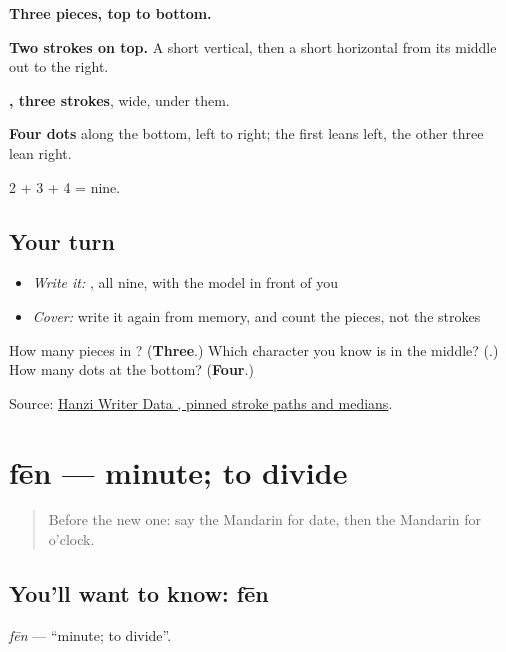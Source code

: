 \begin{quote}
\end{quote}

\textbf{Three pieces, top to bottom.}

\textbf{Two strokes on top.} A short vertical, then a short horizontal from its middle out to the right.

\textbf{, three strokes}, wide, under them.

\textbf{Four dots} along the bottom, left to right; the first leans left, the other three lean right.

2 + 3 + 4 = nine.

\subsection*{Your turn}
\begin{itemize}
\raggedright
  \item \emph{Write it:} , all nine, with the model in front of you
  \item \emph{Cover:} write it again from memory, and count the pieces, not the strokes
\end{itemize}

\begin{tcolorbox}[breakable,colback=teal!4,colframe=teal!35!black,title={Before you move on}]
How many pieces in ? (\textbf{Three}.) Which character you know is in the middle? (\textbf{}.) How many dots at the bottom? (\textbf{Four}.)

Source: \href{https://raw.githubusercontent.com/chanind/hanzi-writer-data/68d10a4b21150cae5e1ebbd223eed289cf32d90c/data/\%E7\%82\%B9.json}{Hanzi Writer Data , pinned stroke paths and medians}.
\end{tcolorbox}
\section[fēn]{fēn — minute; to divide}

\label{lesson:ZH-C48-fen}



\begin{quote}
Before the new one: say the Mandarin for date, then the Mandarin for o'clock.
\end{quote}

\subsection*{You'll want to know: fēn}
\emph{fēn} — \textquotedblleft{}minute; to divide\textquotedblright{}.

